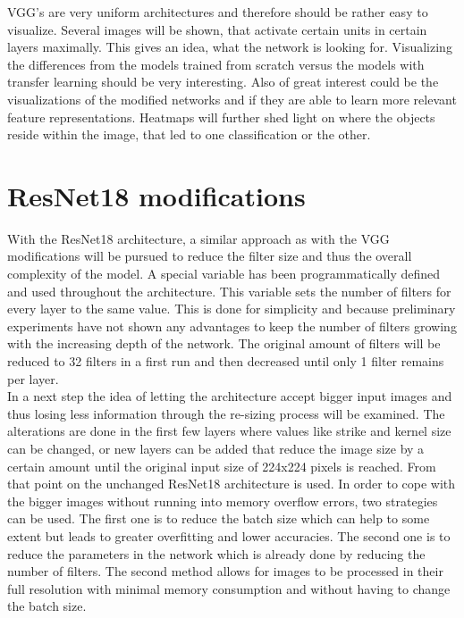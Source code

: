 VGG's are very uniform architectures and therefore should be rather easy to visualize. Several images will be shown, that activate certain units in certain layers maximally. This gives an idea, what the network is looking for. Visualizing the differences from the models trained from scratch versus the models with transfer learning should be very interesting. Also of great interest could be the visualizations of the modified networks and if they are able to learn more relevant feature representations. Heatmaps will further shed light on where the objects reside within the  image, that led to one classification or the other. \\


\section{ResNet18 modifications}

With the ResNet18 architecture, a similar approach as with the VGG modifications will be pursued to reduce the filter size and thus the overall complexity of the model. A special variable has been programmatically defined and used throughout the architecture. This variable sets the number of filters for every layer to the same value. This is done for simplicity and because preliminary  experiments  have not shown any advantages to keep the number of filters growing with the increasing depth of the network. The original amount of filters will be reduced to 32 filters in a first run and then decreased until only 1 filter remains per layer. \\

In a next step the idea of letting the architecture accept bigger input images and thus losing less information through the re-sizing process will be examined. The alterations are done in the first few layers where values like strike and kernel size can be changed, or new layers can be added that reduce the image size by a certain amount until the original input size of 224x224 pixels is reached. From that point on the unchanged ResNet18 architecture is used. In order to cope with the bigger images without running into memory overflow errors, two strategies can be used.  The  first one is  to reduce the batch size which can  help to some extent but leads to greater overfitting and lower accuracies. The second one is to reduce the  parameters in  the network which is already done by reducing the number of filters. The second method allows for images to be processed in their full resolution with minimal memory consumption and without having to change the batch size.\\


